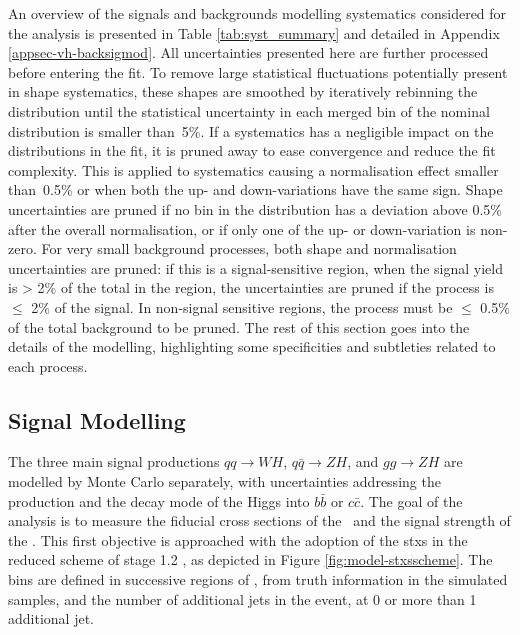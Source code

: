 An overview of the signals and backgrounds modelling systematics considered for the analysis is presented in Table \ref{tab:syst_summary} and detailed in Appendix \ref{appsec-vh-backsigmod}. All uncertainties presented here are further processed before entering the fit. To remove large statistical fluctuations potentially present in shape systematics, these shapes are smoothed by iteratively rebinning the distribution until the statistical uncertainty in each merged bin of the nominal distribution is smaller than~5\%. If a systematics has a negligible impact on the distributions in the fit, it is pruned away to ease convergence and reduce the fit complexity. This is applied to systematics causing a normalisation effect smaller than~0.5\% or when both the up- and down-variations have the same sign. Shape uncertainties are pruned if no bin in the distribution has a deviation above 0.5\% after the overall normalisation, or if only one of the up- or down-variation is non-zero. For very small background processes, both shape and normalisation uncertainties are pruned: if this is a signal-sensitive region, when the signal yield is > 2\% of the total in the region, the uncertainties are pruned if the process is $\leq$ 2\% of the signal. In non-signal sensitive regions, the process must be $\leq$ 0.5\% of the total background to be pruned. The rest of this section goes into the details of the modelling, highlighting some specificities and subtleties related to each process. 

\subsection{Signal Modelling}\label{sec-modSignal}
The three main signal productions $qq \rightarrow WH$, $q\bar{q} \rightarrow ZH$, and $gg \rightarrow ZH$ are modelled by Monte Carlo separately, with uncertainties addressing the production and the decay mode of the Higgs into $b\bar{b}$ or $c\bar{c}$. The goal of the analysis is to measure the fiducial cross sections of the \vhb\ and the signal strength of the \vhc. This first objective is approached with the adoption of the \gls{stxs} in the reduced scheme of stage 1.2 \cite{badger2016les, berger2019simplified}, as depicted in Figure \ref{fig:model-stxsscheme}. The bins are defined in successive regions of \ptv, from truth information in the simulated samples, and the number of additional jets in the event, at 0 or more than 1 additional jet.
  
